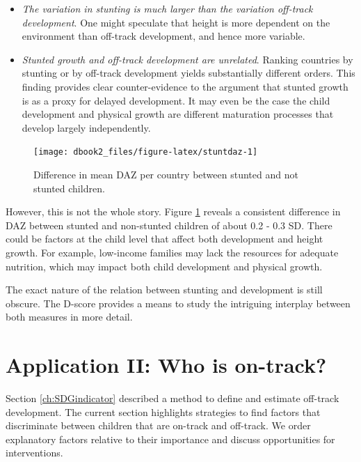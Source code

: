 \documentclass[
]{book}
\providecommand{\tightlist}{%
  \setlength{\itemsep}{0pt}\setlength{\parskip}{0pt}}
\begin{document}
\begin{itemize}
\tightlist
\item
  \emph{The variation in stunting is much larger than the variation off-track development}. One might speculate that height is more dependent on the environment than off-track development, and hence more variable.
\item
  \emph{Stunted growth and off-track development are unrelated}. Ranking countries by stunting or by off-track development yields substantially different orders. This finding provides clear counter-evidence to the argument that stunted growth is as a proxy for delayed development. It may even be the case the child development and physical growth are different maturation processes that develop largely independently.
\end{itemize}

\begin{figure}

{\centering \texttt{[image: dbook2\_files/figure-latex/stuntdaz-1]} 

}

\caption{Difference in mean DAZ per country between stunted and not stunted children.}\label{fig:stuntdaz}
\end{figure}



However, this is not the whole story. Figure \ref{fig:stuntdaz} reveals a consistent difference in DAZ between stunted and non-stunted children of about 0.2 - 0.3 SD. There could be factors at the child level that affect both development and height growth. For example, low-income families may lack the resources for adequate nutrition, which may impact both child development and physical growth.

The exact nature of the relation between stunting and development is still obscure. The D-score provides a means to study the intriguing interplay between both measures in more detail.

\newpage

\hypertarget{ch:ontrack}{%
\chapter{Application II: Who is on-track?}\label{ch:ontrack}}

Section \ref{ch:SDGindicator} described a method to define and estimate off-track development. The current section highlights strategies to find factors that discriminate between children that are on-track and off-track. We order explanatory factors relative to their importance and discuss opportunities for interventions.
\end{document}
